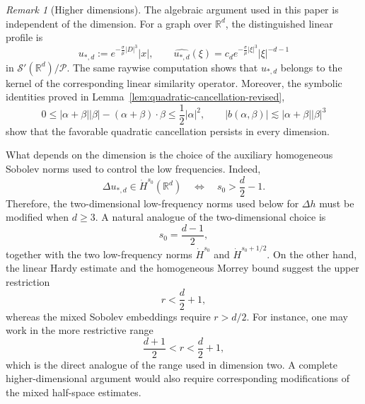 \documentclass[12pt]{amsart}
\theoremstyle{remark}
\newtheorem{remark}{Remark}[section]
\theoremstyle{definition}
\numberwithin{equation}{section}
\newcommand{\R}{\mathbb{R}}
\begin{document}
\begin{remark}[Higher dimensions]
\label{rem:higher-dim}
The algebraic argument used in this paper is independent of the dimension.
For a graph over \(\R^d\), the distinguished linear profile is
\[
 u_{*,d} := e^{-\frac{\sigma}{\mu}|D|^3}|x|, \qquad
 \widehat{u_{*,d}}(\xi)
 = c_d e^{-\frac{\sigma}{\mu}|\xi|^3} |\xi|^{-d-1}
\]
in \(\mathcal S'(\R^d)/\mathcal P\). 
The same raywise computation
shows that \(u_{*,d}\) belongs to the kernel of the corresponding linear similarity operator.
Moreover, the symbolic identities proved in Lemma~\ref{lem:quadratic-cancellation-revised},
\[
0 \leq |\alpha+\beta||\beta| - (\alpha+\beta)\cdot\beta \leq \frac12|\alpha|^2, \qquad
 |b(\alpha,\beta)| \lesssim |\alpha+\beta||\beta|^3
\]
show that the favorable quadratic cancellation persists in every dimension.

What depends on the dimension is the choice of the auxiliary
homogeneous Sobolev norms used to control the low frequencies.
Indeed,
\[
 \Delta u_{*,d}\in\dot H^{s_0}(\R^d)
 \quad\Longleftrightarrow\quad
 s_0>\frac d2-1.
\]
Therefore, the two-dimensional low-frequency norms used below for
\(\Delta h\) must be modified when \(d\geq3\).  A natural analogue of the two-dimensional choice is
\[
 s_0=\frac{d-1}{2},
\]
together with the two low-frequency norms \(\dot H^{s_0}\) and \(\dot H^{s_0+1/2}\).
On the other hand, the linear Hardy estimate and the homogeneous Morrey bound suggest the upper restriction
\[
 r<\frac d2+1,
\]
whereas the mixed Sobolev embeddings require \(r>d/2\).
For instance, one may work in the more restrictive range
\[
 \frac{d+1}{2}<r<\frac d2+1,
\]
which is the direct analogue of the range used in dimension two.
A complete higher-dimensional argument would also require corresponding modifications of the mixed half-space estimates.
\end{remark}
\end{document}
